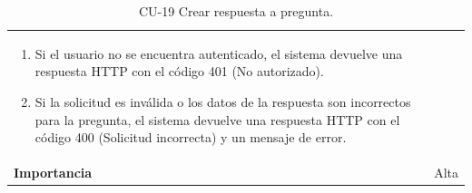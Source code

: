 \begin{table}[p]
\begin{tabularx}{\linewidth}{ p{} p{} }
\begin{enumerate}
			\tightlist
			\item Si el usuario no se encuentra autenticado, el sistema devuelve una respuesta HTTP con el código            401 (No autorizado).
			\item Si la solicitud es inválida o los datos de la respuesta son incorrectos para la pregunta, el sistema devuelve una respuesta HTTP con el código 400 (Solicitud incorrecta) y un mensaje de error.
            \end{enumerate}\\
		\textbf{Importancia}          & Alta \\
		\bottomrule
	\end{tabularx}
	\caption{CU-19 Crear respuesta a pregunta.}
\end{table}

